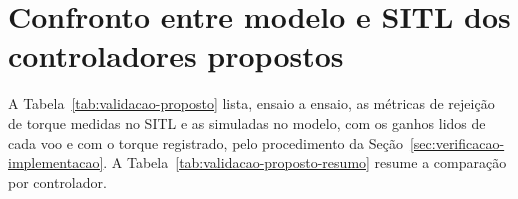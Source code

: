 \chapter{Confronto entre modelo e SITL dos controladores propostos}
\label{ap:validacao-proposto}

A Tabela~\ref{tab:validacao-proposto} lista, ensaio a ensaio, as métricas de
rejeição de torque medidas no SITL e as simuladas no modelo, com os ganhos
lidos de cada voo e com o torque registrado, pelo procedimento da
Seção~\ref{sec:verificacao-implementacao}. A
Tabela~\ref{tab:validacao-proposto-resumo} resume a comparação por
controlador.

{\footnotesize

}

